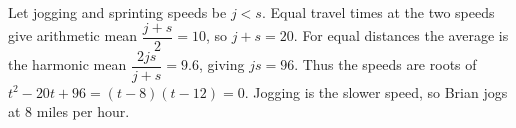Let jogging and sprinting speeds be $j<s$. Equal travel times at the two speeds give arithmetic mean $\dfrac{j+s}{2}=10$, so $j+s=20$. For equal distances the average is the harmonic mean $\dfrac{2js}{j+s}=9.6$, giving $js=96$. Thus the speeds are roots of $t^2-20t+96=(t-8)(t-12)=0$. Jogging is the slower speed, so Brian jogs at $\boxed8$ miles per hour.
